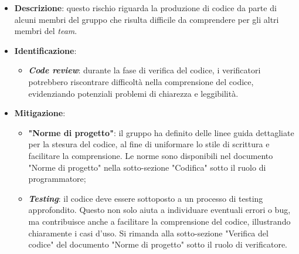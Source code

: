 \label{risk:codice incomprensibile}
\begin{itemize}
	\item \textbf{Descrizione}: questo rischio riguarda la produzione di codice 
								da parte di alcuni membri del gruppo che risulta 
								difficile da comprendere per gli altri membri del \textit{team}.
	\item \textbf{Identificazione}:
	      \begin{itemize}
		      \item \textbf{\textit{Code review}}: durante la fase di verifica del codice, 
			  									i verificatori potrebbero riscontrare difficoltà 
												nella comprensione del codice, evidenziando 
												potenziali problemi di chiarezza e leggibilità.
	      \end{itemize}

	\item \textbf{Mitigazione}:
	      \begin{itemize}
		      \item \textbf{"Norme di progetto"}: il gruppo ha definito delle linee guida dettagliate 
			  		per la stesura del codice, al fine di uniformare lo stile di scrittura e facilitare 
					la comprensione. Le norme sono disponibili nel documento "Norme di progetto" 
					nella sotto-sezione "Codifica" sotto il ruolo di programmatore;

		      \item \textbf{\textit{Testing}}: il codice deve essere sottoposto a un processo di 
			  		testing approfondito. Questo non solo aiuta a individuare eventuali errori o bug, 
					ma contribuisce anche a facilitare la comprensione del codice, illustrando 
					chiaramente i casi d'uso. Si rimanda alla sotto-sezione "Verifica del codice" 
					del documento "Norme di progetto" sotto il ruolo di verificatore.
	      \end{itemize}
\end{itemize}
